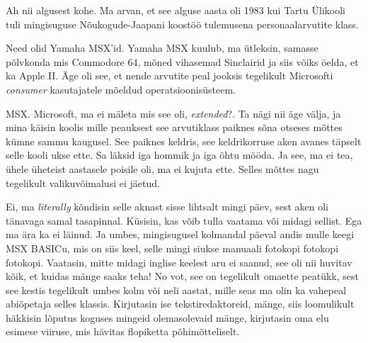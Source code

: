 
Ah nii algusest kohe. Ma arvan, et see alguse aasta oli 1983 kui  Tartu 
Ülikooli tuli mingisuguse Nõukogude-Jaapani koostöö 
tulemusena personaalarvutite klass.


Need olid Yamaha MSX'id. Yamaha MSX kuulub, ma 
ütleksin, samasse põlvkonda mis Commodore 64, mõned vihasemad Sinclairid ja 
siis võiks öelda, et ka Apple II. Äge oli see, et  nende arvutite peal jooksis 
tegelikult Microsofti  \emph{consumer} kasutajatele mõeldud operatsioonisüsteem.


MSX. Microsoft, ma ei mäleta mis see oli, \emph{extended}?. Ta nägi nii äge välja, ja mina käisin koolis mille peauksest see 
arvutiklass paiknes sõna otseses mõttes kümne sammu kaugusel. See paiknes 
keldris, see keldrikorruse aken avanes täpselt selle kooli ukse ette. Sa läksid 
iga hommik ja iga õhtu mööda. Ja see, ma ei tea, ühele üheteist aastasele 
poisile oli, ma ei kujuta ette. Selles mõttes nagu tegelikult  valikuvõimalusi 
ei jäetud. 


Ei, ma \emph{literally} kõndisin selle aknast sisse lihtsalt mingi päev, sest 
aken oli tänavaga samal tasapinnal. Küsisin, kas võib tulla vaatama või midagi 
sellist. Ega ma ära ka ei läinud. Ja  umbes, mingisugusel kolmandal päeval 
andis mulle keegi MSX BASICu, mis on siis keel, 
selle mingi siukse manuaali fotokopi fotokopi fotokopi. Vaatasin, mitte midagi 
inglise keelest aru ei saanud, see oli nii huvitav kõik, et kuidas mänge saaks 
teha! No vot, see on tegelikult omaette peatükk, sest see kestis tegelikult 
umbes kolm või neli aastat, mille seas ma olin ka vahepeal abiõpetaja selles 
klassis.  Kirjutasin ise tekstiredaktoreid, mänge, siis loomulikult häkkisin 
lõputus koguses mingeid olemasolevaid mänge, kirjutasin oma elu esimese 
viiruse, mis hävitas flopiketta põhimõtteliselt. 


